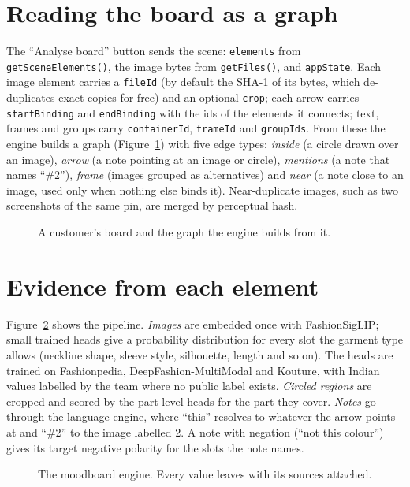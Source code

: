 \section{Reading the board as a graph}

The ``Analyse board'' button sends the scene: \texttt{elements} from \texttt{getSceneElements()}, the image bytes from \texttt{getFiles()}, and \texttt{appState}. Each image element carries a \texttt{fileId} (by default the SHA-1 of its bytes, which de-duplicates exact copies for free) and an optional \texttt{crop}; each arrow carries \texttt{startBinding} and \texttt{endBinding} with the ids of the elements it connects; text, frames and groups carry \texttt{containerId}, \texttt{frameId} and \texttt{groupIds}. From these the engine builds a graph (Figure~\ref{fig:board}) with five edge types: \emph{inside} (a circle drawn over an image), \emph{arrow} (a note pointing at an image or circle), \emph{mentions} (a note that names ``\#2''), \emph{frame} (images grouped as alternatives) and \emph{near} (a note close to an image, used only when nothing else binds it). Near-duplicate images, such as two screenshots of the same pin, are merged by perceptual hash.

\begin{figure}[h]
\centering
\caption{A customer's board and the graph the engine builds from it.}\label{fig:board}
\end{figure}

\section{Evidence from each element}

Figure~\ref{fig:mood} shows the pipeline. \emph{Images} are embedded once with FashionSigLIP; small trained heads give a probability distribution for every slot the garment type allows (neckline shape, sleeve style, silhouette, length and so on). The heads are trained on Fashionpedia, DeepFashion-MultiModal and Kouture, with Indian values labelled by the team where no public label exists. \emph{Circled regions} are cropped and scored by the part-level heads for the part they cover. \emph{Notes} go through the language engine, where ``this'' resolves to whatever the arrow points at and ``\#2'' to the image labelled 2. A note with negation (``not this colour'') gives its target negative polarity for the slots the note names.

\begin{figure}[h]
\centering
\caption{The moodboard engine. Every value leaves with its sources attached.}\label{fig:mood}
\end{figure}

